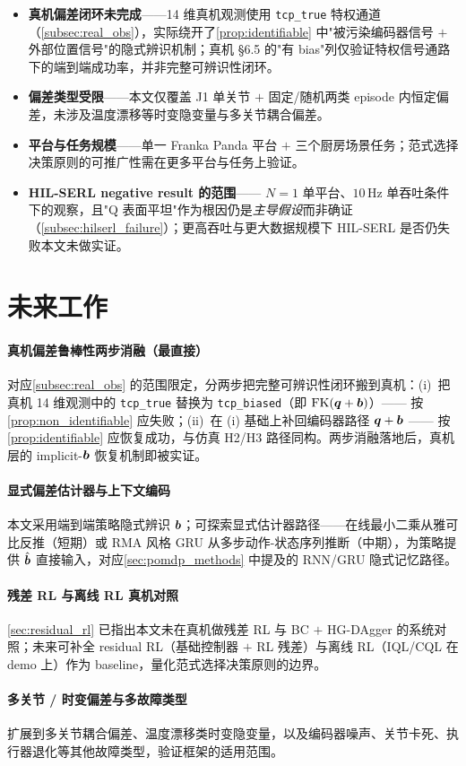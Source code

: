 \begin{itemize}
  \item \textbf{真机偏差闭环未完成}——14 维真机观测使用 \texttt{tcp\_true} 特权通道（\cref{subsec:real_obs}），实际绕开了\cref{prop:identifiable} 中"被污染编码器信号 $+$ 外部位置信号"的隐式辨识机制；真机 §6.5 的"有 bias"列仅验证特权信号通路下的端到端成功率，并非完整可辨识性闭环。
  \item \textbf{偏差类型受限}——本文仅覆盖 J1 单关节 $+$ 固定/随机两类 episode 内恒定偏差，未涉及温度漂移等时变隐变量与多关节耦合偏差。
  \item \textbf{平台与任务规模}——单一 Franka Panda 平台 $+$ 三个厨房场景任务；范式选择决策原则的可推广性需在更多平台与任务上验证。
  \item \textbf{HIL-SERL negative result 的范围}—— $N=1$ 单平台、$10$\,Hz 单吞吐条件下的观察，且"Q 表面平坦"作为根因仍是\emph{主导假设}而非确证（\cref{subsec:hilserl_failure}）；更高吞吐与更大数据规模下 HIL-SERL 是否仍失败本文未做实证。
\end{itemize}

\section{未来工作}\label{sec:future_work}

\paragraph{真机偏差鲁棒性两步消融（最直接）}对应\cref{subsec:real_obs} 的范围限定，分两步把完整可辨识性闭环搬到真机：(i)~把真机 14 维观测中的 \texttt{tcp\_true} 替换为 \texttt{tcp\_biased}（即 $\text{FK}(\bm{q}+\bm{b})$）—— 按\cref{prop:non_identifiable} 应失败；(ii)~在 (i) 基础上补回编码器路径 $\bm{q}+\bm{b}$ —— 按\cref{prop:identifiable} 应恢复成功，与仿真 H2/H3 路径同构。两步消融落地后，真机层的 implicit-$\bm{b}$ 恢复机制即被实证。

\paragraph{显式偏差估计器与上下文编码}本文采用端到端策略隐式辨识 $\bm{b}$；可探索显式估计器路径——在线最小二乘从雅可比反推（短期）或 RMA 风格 GRU 从多步动作-状态序列推断（中期），为策略提供 $\hat{\bm{b}}$ 直接输入，对应\cref{sec:pomdp_methods} 中提及的 RNN/GRU 隐式记忆路径。

\paragraph{残差 RL 与离线 RL 真机对照}\cref{sec:residual_rl} 已指出本文未在真机做残差 RL 与 BC $+$ HG-DAgger 的系统对照；未来可补全 residual RL（基础控制器 $+$ RL 残差）与离线 RL（IQL/CQL 在 demo 上）作为 baseline，量化范式选择决策原则的边界。

\paragraph{多关节 / 时变偏差与多故障类型}扩展到多关节耦合偏差、温度漂移类时变隐变量，以及编码器噪声、关节卡死、执行器退化等其他故障类型，验证框架的适用范围。
